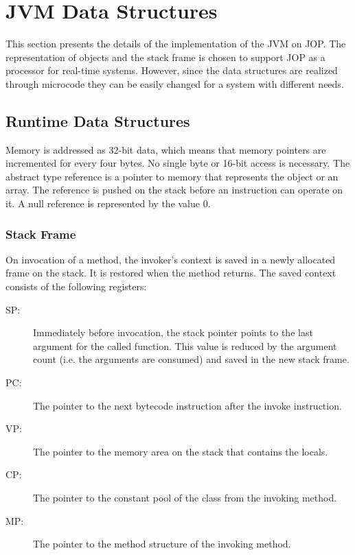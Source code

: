 \section{JVM Data Structures}

This section presents the details of the implementation of the JVM on
JOP. The representation of objects and the stack frame is chosen to
support JOP as a processor for real-time systems. However, since the
data structures are realized through microcode they can be easily
changed for a system with different needs.

\subsection{Runtime Data Structures}

Memory is addressed as 32-bit data, which means that memory pointers
are incremented for every four bytes. No single byte or 16-bit
access is necessary. The abstract type reference is a pointer to
memory that represents the object or an array. The reference is
pushed on the stack before an instruction can operate on it. A null
reference is represented by the value 0.

\subsubsection{Stack Frame}

On invocation of a method, the invoker's context is saved in a newly
allocated frame on the stack. It is restored when the method returns.
The saved context consists of the following registers:

\begin{description}

\item[SP:] Immediately before invocation, the stack pointer
    points to the last argument for the called function. This
    value is reduced by the argument count (i.e. the arguments
    are consumed) and saved in the new stack frame.

\item[PC:] The pointer to the next bytecode instruction after the invoke
instruction.

\item[VP:] The pointer to the memory area on the stack that contains
the locals.

\item[CP:] The pointer to the constant pool of the class from the invoking
method.

\item[MP:] The pointer to the method structure of the invoking method.

\end{description}

